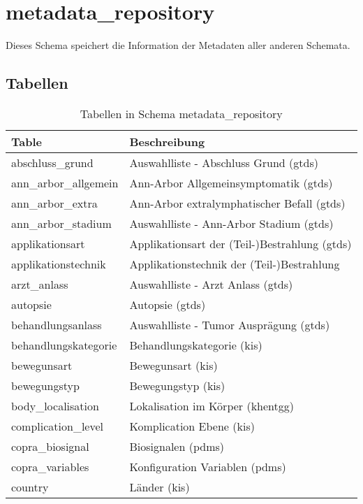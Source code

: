   \section{metadata\_repository}
  Dieses Schema speichert die Information der Metadaten aller anderen Schemata.
  
  \subsection{Tabellen}
  \label{tb:metarepo}
  \begin{longtable}{||p{5.3cm}|p{9cm}||}  	
  	\caption{Tabellen in Schema metadata\_repository} \\  	
  	\hline Table & Beschreibung \\ \hline \hline
  	abschluss\_grund & Auswahlliste - Abschluss Grund (\ac{gtds}) \\ \hline
  	ann\_arbor\_allgemein & Ann-Arbor Allgemeinsymptomatik (\ac{gtds}) \\ \hline
  	ann\_arbor\_extra & Ann-Arbor extralymphatischer Befall (\ac{gtds}) \\ \hline
  	ann\_arbor\_stadium & Auswahlliste - Ann-Arbor Stadium (\ac{gtds}) \\ \hline
  	applikationsart & Applikationsart der (Teil-)Bestrahlung (\ac{gtds}) \\ \hline
  	applikationstechnik & Applikationstechnik der (Teil-)Bestrahlung\\ \hline
  	arzt\_anlass & Auswahlliste - Arzt Anlass (\ac{gtds})\\ \hline
  	autopsie & Autopsie (\ac{gtds}) \\ \hline
  	behandlungsanlass & Auswahlliste - Tumor Ausprägung (\ac{gtds}) \\ \hline
  	behandlungskategorie & Behandlungskategorie (\ac{kis}) \\ \hline
  	bewegunsart & Bewegunsart (\ac{kis})\\ \hline
  	bewegungstyp & Bewegungstyp (\ac{kis}) \\ \hline
  	body\_localisation & Lokalisation im Körper (\ac{khentgg})\\ \hline
  	complication\_level & Komplication Ebene (\ac{kis}) \\ \hline
  	copra\_biosignal & Biosignalen (\ac{pdms}) \\ \hline
  	copra\_variables & Konfiguration Variablen (\ac{pdms}) \\ \hline
  	country & Länder (\ac{kis}) \\ \hline

\end{longtable}
